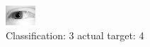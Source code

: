 \begin{figure}[h!]
\begin{center}
\includegraphics[width=0.60\columnwidth]{figures/ID2418_class_3_target_4.png}
\end{center}
\caption{ Classification: 3 actual target: 4}
\label{fig:ID2418_class_3_target_4}
\end{figure}
